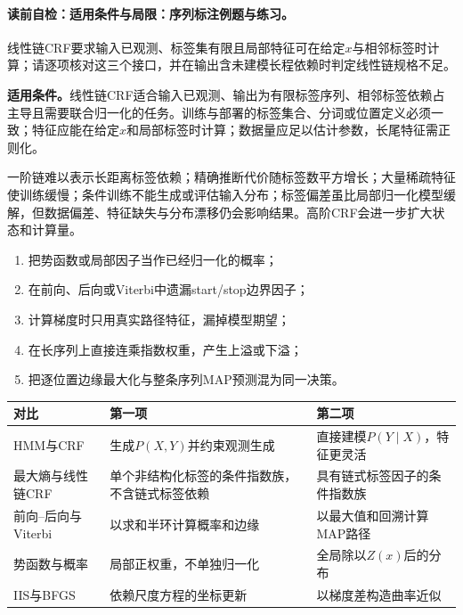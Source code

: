 \label{struct:V3-C06-CH28}
\paragraph{读前自检：适用条件与局限：序列标注例题与练习。}线性链CRF要求输入已观测、标签集有限且局部特征可在给定$x$与相邻标签时计算；请逐项核对这三个接口，并在输出含未建模长程依赖时判定线性链规格不足。\par

\begin{applicabilitybox}
\textbf{适用条件。}线性链CRF适合输入已观测、输出为有限标签序列、相邻标签依赖占主导且需要联合归一化的任务。训练与部署的标签集合、分词或位置定义必须一致；特征应能在给定$x$和局部标签时计算；数据量应足以估计参数，长尾特征需正则化。
\end{applicabilitybox}

\label{struct:V3-C06-CH29}
\begin{notapplicablebox}[title=\SLMethodLimitationsTitle]
一阶链难以表示长距离标签依赖；精确推断代价随标签数平方增长；大量稀疏特征使训练缓慢；条件训练不能生成或评估输入分布；标签偏差虽比局部归一化模型缓解，但数据偏差、特征缺失与分布漂移仍会影响结果。高阶CRF会进一步扩大状态和计算量。
\end{notapplicablebox}

\label{struct:V3-C06-CH30}
\begin{warningbox}
\begin{enumerate}[leftmargin=2.2em]
  \item 把势函数或局部因子当作已经归一化的概率；
  \item 在前向、后向或Viterbi中遗漏start/stop边界因子；
  \item 计算梯度时只用真实路径特征，漏掉模型期望；
  \item 在长序列上直接连乘指数权重，产生上溢或下溢；
  \item 把逐位置边缘最大化与整条序列MAP预测混为同一决策。
\end{enumerate}
\end{warningbox}

\label{struct:V3-C06-CH31}
\begin{comparisonbox}
\begin{tabularx}{\linewidth}{@{}l X X@{}}
\toprule 对比 & 第一项 & 第二项\\ \midrule
HMM与CRF & 生成$P(X,Y)$并约束观测生成 & 直接建模$P(Y\mid X)$，特征更灵活\\
最大熵与线性链CRF & 单个非结构化标签的条件指数族，不含链式标签依赖 & 具有链式标签因子的条件指数族\\
前向--后向与Viterbi & 以求和半环计算概率和边缘 & 以最大值和回溯计算MAP路径\\
势函数与概率 & 局部正权重，不单独归一化 & 全局除以$Z(x)$后的分布\\
IIS与BFGS & 依赖尺度方程的坐标更新 & 以梯度差构造曲率近似\\
\bottomrule
\end{tabularx}
\end{comparisonbox}


